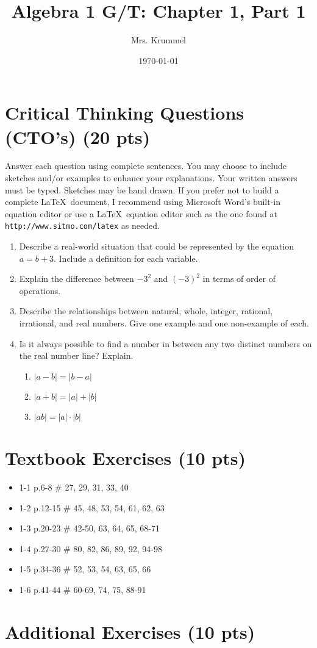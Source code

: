 \documentclass[11pt]{article}
\begin{document}
\title{Algebra 1 G/T: Chapter 1, Part 1}
\author{Mrs. Krummel}
\date{\today}
\maketitle


\section{Critical Thinking Questions (CTO's) (20 pts)}

Answer each question using complete sentences. You may choose to include sketches and/or examples to enhance your explanations. Your written answers must be typed. Sketches may be hand drawn. If you prefer not to build a complete \LaTeX \ document, I recommend using Microsoft Word's built-in equation editor or use a \LaTeX \ equation editor such as the one found at \texttt{http://www.sitmo.com/latex} as needed.

\begin{enumerate}
\item Describe a real-world situation that could be represented by the equation $a=b+3$. Include a definition for each variable.
\item Explain the difference between $-3^2$ and $(-3)^2$ in terms of order of operations.
\item Describe the relationships between natural, whole, integer, rational, irrational, and real numbers. Give one example and one non-example of each.
\item Is it always possible to find a number in between any two distinct numbers on the real number line? Explain.
	\begin{enumerate}
	\item $\left| a-b \right|=\left| b - a\right|$
	\item $\left| a+b \right| = \left| a \right| + \left| b \right|$
	\item $\left| ab \right| = \left| a \right| \cdot \left| b \right|$
	\end{enumerate}
	
\end{enumerate}

\section{Textbook Exercises (10 pts)}
\begin{itemize}
\item[] 1-1 p.6-8 \# 27, 29, 31, 33, 40
\item[] 1-2 p.12-15 \# 45, 48, 53, 54, 61, 62, 63
\item[] 1-3 p.20-23 \# 42-50, 63, 64, 65, 68-71
\item[] 1-4 p.27-30 \# 80, 82, 86, 89, 92, 94-98
\item[] 1-5 p.34-36 \# 52, 53, 54, 63, 65, 66
\item[] 1-6 p.41-44 \# 60-69, 74, 75, 88-91
\end{itemize}

\section{Additional Exercises (10 pts)}
\end{document}
